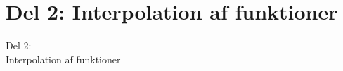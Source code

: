 \section{Del 2: Interpolation af funktioner}
\begin{frame}
\centering
\Huge
Del 2: \\
Interpolation af funktioner
\end{frame}
%







